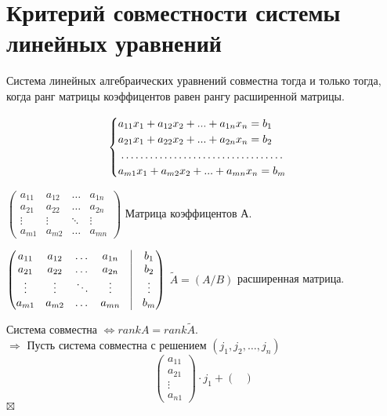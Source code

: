 \documentclass[a4paper, 12pt]{report}
\newenvironment{Proof}
{\par\noindent{$\blacklozenge$}}
{\hfill$\scriptstyle\boxtimes$}
\begin{document}
\section{Критерий совместности системы линейных уравнений}
Система линейных алгебраических уравнений совместна тогда и только тогда, когда ранг матрицы коэффицентов равен рангу расширенной матрицы.
\begin{Proof}
   $$ \begin{cases}
        a_{11}x_1+a_{12}x_2+...+a_{1n}x_n=b_1\\
        a_{21}x_1+a_{22}x_2+...+a_{2n}x_n=b_2\\
        \dotfill\\
        a_{m1}x_1+a_{m2}x_2+...+a_{mn}x_n=b_m
    \end{cases}$$
    \begin{center}
    $\begin{pmatrix}
    a_{11} & a_{12} & \dots & a_{1n}\\
    a_{21} & a_{22} & \dots & a_{2n}\\
    \vdots & \vdots & \ddots & \vdots\\
    a_{m1} & a_{m2} & \dots & a_{mn}
    \end{pmatrix}$
    Матрица коэффицентов А.\\
    \end{center}
    \begin{center}
     $\begin{pmatrix}
    a_{11} & a_{12} & \dots & a_{1n} & \vline & b_1\\
    a_{21} & a_{22} & \dots & a_{2n} & \vline & b_2\\
    \vdots & \vdots & \ddots & \vdots & \vline & \vdots\\
    a_{m1} & a_{m2} & \dots & a_{mn} & \vline & b_m
    \end{pmatrix}$
    $\widetilde{A} = (A/B)$ расширенная матрица.   
    \end{center}
    Система совместна $\Leftrightarrow rankA=rank\widetilde{A}$. \\
    $\Rightarrow$ Пусть система совместна с решением $(j_1,j_2, \dots, j_n)$\\
    $$\begin{pmatrix}
    a_{11}\\
    a_{21}\\
    \vdots\\
    a_{n1}
    \end{pmatrix} \cdot j_1+
    \begin{pmatrix}

\end{pmatrix}$$
\end{Proof}
\end{document}
